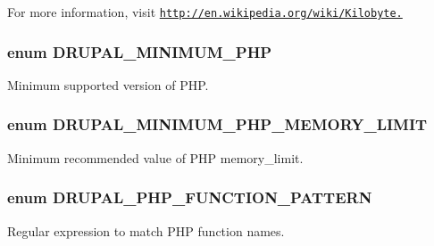 For more information, visit \href{http://en.wikipedia.org/wiki/Kilobyte.}{\tt http://en.wikipedia.org/wiki/Kilobyte.} \hypertarget{bootstrap_8inc_a370c52d1679da96064df124c55f16ea8}{
\subsubsection[{DRUPAL\_\-MINIMUM\_\-PHP}]{\setlength{\rightskip}{0pt plus 5cm}enum {\bf DRUPAL\_\-MINIMUM\_\-PHP}}}
\label{bootstrap_8inc_a370c52d1679da96064df124c55f16ea8}
Minimum supported version of PHP. \hypertarget{bootstrap_8inc_a996d6c835e5fee7728aed6a4dfc6a6aa}{
\subsubsection[{DRUPAL\_\-MINIMUM\_\-PHP\_\-MEMORY\_\-LIMIT}]{\setlength{\rightskip}{0pt plus 5cm}enum {\bf DRUPAL\_\-MINIMUM\_\-PHP\_\-MEMORY\_\-LIMIT}}}
\label{bootstrap_8inc_a996d6c835e5fee7728aed6a4dfc6a6aa}
Minimum recommended value of PHP memory\_\-limit. \hypertarget{bootstrap_8inc_ac2b8a8a3549cb6839c538ebc812ecf8c}{
\subsubsection[{DRUPAL\_\-PHP\_\-FUNCTION\_\-PATTERN}]{\setlength{\rightskip}{0pt plus 5cm}enum {\bf DRUPAL\_\-PHP\_\-FUNCTION\_\-PATTERN}}}
\label{bootstrap_8inc_ac2b8a8a3549cb6839c538ebc812ecf8c}
Regular expression to match PHP function names.

